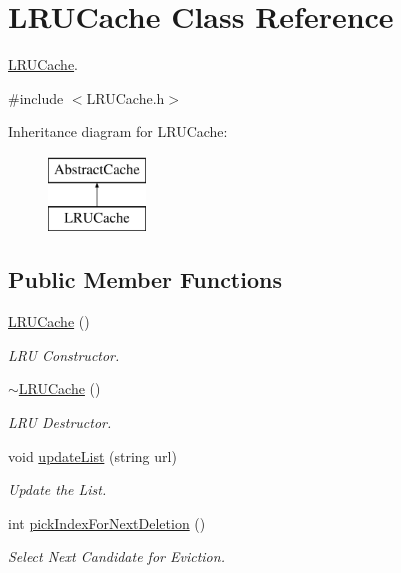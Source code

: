 \hypertarget{classLRUCache}{\section{\-L\-R\-U\-Cache \-Class \-Reference}
\label{classLRUCache}
}


\hyperlink{classLRUCache}{\-L\-R\-U\-Cache}.  




{\ttfamily \#include $<$\-L\-R\-U\-Cache.\-h$>$}

\-Inheritance diagram for \-L\-R\-U\-Cache\-:\begin{figure}[H]
\begin{center}
\leavevmode
\includegraphics[height=2.000000cm]{classLRUCache}
\end{center}
\end{figure}
\subsection*{\-Public \-Member \-Functions}
\begin{DoxyCompactItemize}
\item 
\hypertarget{classLRUCache_a6f624ad11516bc5c8b56ab19250902bb}{\hyperlink{classLRUCache_a6f624ad11516bc5c8b56ab19250902bb}{\-L\-R\-U\-Cache} ()}\label{classLRUCache_a6f624ad11516bc5c8b56ab19250902bb}

\begin{DoxyCompactList}\small\item\em \-L\-R\-U \-Constructor. \end{DoxyCompactList}\item 
\hypertarget{classLRUCache_ac841ed5b67e603f2878c26ea7555385f}{\hyperlink{classLRUCache_ac841ed5b67e603f2878c26ea7555385f}{$\sim$\-L\-R\-U\-Cache} ()}\label{classLRUCache_ac841ed5b67e603f2878c26ea7555385f}

\begin{DoxyCompactList}\small\item\em \-L\-R\-U \-Destructor. \end{DoxyCompactList}\item 
void \hyperlink{classLRUCache_a9ade7fe6ec5353a5b4259ad48929122b}{update\-List} (string url)
\begin{DoxyCompactList}\small\item\em \-Update the \-List. \end{DoxyCompactList}\item 
int \hyperlink{classLRUCache_ab5e4e2db90274ce42e32f0ea466db0ef}{pick\-Index\-For\-Next\-Deletion} ()
\begin{DoxyCompactList}\small\item\em \-Select \-Next \-Candidate for \-Eviction. \end{DoxyCompactList}\end{DoxyCompactItemize}


